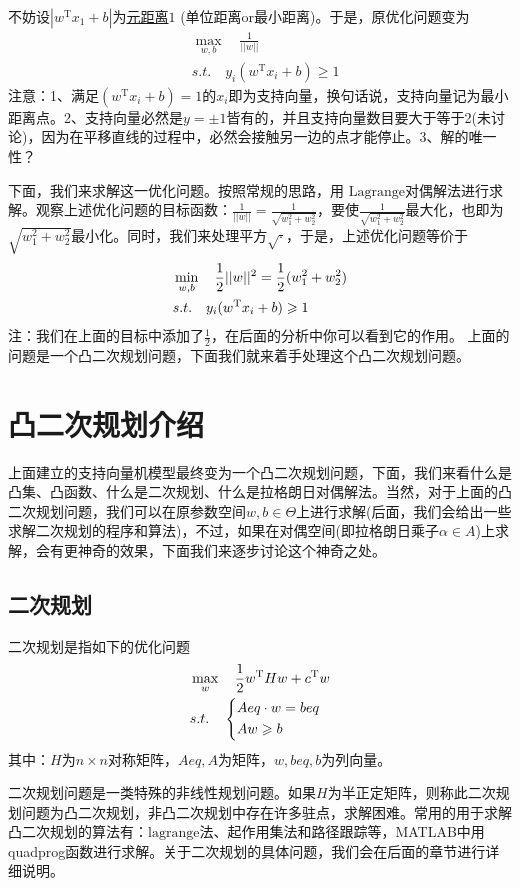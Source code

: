 	不妨设$|w^\mathrm{T} x_1+b|$为\underline{元距离}$1$ (单位距离or最小距离)。于是，原优化问题变为
	\begin{align*}
	&\max_{w,b}\quad \frac{1}{||w||} \\
	&s.t.\quad y_i(w^ \mathrm{ T } x_i+b )  \geqslant  1
	\end{align*}
	注意：1、满足$(w^ \mathrm{ T } x_i+b )=1$的$x_i$即为支持向量，换句话说，支持向量记为最小距离点。2、支持向量必然是$y=\pm 1$皆有的，并且支持向量数目要大于等于2(未讨论)，因为在平移直线的过程中，必然会接触另一边的点才能停止。3、解的唯一性？
	\par
	下面，我们来求解这一优化问题。按照常规的思路，用 $\mathrm{Lagrange}$对偶解法进行求解。观察上述优化问题的目标函数：$\frac{1}{||w||}=\frac{1}{\sqrt {w_1^2+w_2^2}}$，要使$\frac{1}{\sqrt{w_1^2+w_2^2}}$最大化，也即为$\sqrt{w_1^2+w_2^2}$最小化。同时，我们来处理平方$\sqrt{\cdot}$，于是，上述优化问题等价于
	\begin{align*}
	&\min_{w,b}\quad \frac{1}{2}||w||^2= \frac{1}{2}(w_1^2+w_2^2)\\
	&s.t.\quad y_i(w^ \mathrm{ T } x_i+b )  \geqslant  1\notag
	\end{align*}
	注：我们在上面的目标中添加了$\frac{1}{2}$，在后面的分析中你可以看到它的作用。
	上面的问题是一个凸二次规划问题，下面我们就来着手处理这个凸二次规划问题。

\section{凸二次规划介绍}
	\par
	上面建立的支持向量机模型最终变为一个凸二次规划问题，下面，我们来看什么是凸集、凸函数、什么是二次规划、什么是拉格朗日对偶解法。当然，对于上面的凸二次规划问题，我们可以在原参数空间$w,b\in \Theta$上进行求解(后面，我们会给出一些求解二次规划的程序和算法)，不过，如果在对偶空间(即拉格朗日乘子$\alpha\in A$)上求解，会有更神奇的效果，下面我们来逐步讨论这个神奇之处。

	\subsection{二次规划}
		\label{subsec:支持向量机-基本支持向量机-凸二次规划介绍-二次规划}
		\par
		二次规划是指如下的优化问题
		\begin{align*}
		&\max_{w}\quad \frac{1}{2} w^\mathrm{T}Hw+c^\mathrm{T}w \\
		& s.t.\quad
		\left\{
		\begin{aligned}
		& Aeq\cdot w=beq \notag\\
		& Aw \geqslant  b \notag
		\end{aligned}
		\right.
		\end{align*}
		其中：$H$为$n\times n$对称矩阵，$Aeq,A$为矩阵，$w,beq,b$为列向量。
		\par
		二次规划问题是一类特殊的非线性规划问题。如果$H$为半正定矩阵，则称此二次规划问题为凸二次规划，非凸二次规划中存在许多驻点，求解困难。常用的用于求解凸二次规划的算法有：$\mathrm{lagrange}$法、起作用集法和路径跟踪等，MATLAB中用quadprog函数进行求解。关于二次规划的具体问题，我们会在后面的章节进行详细说明。

